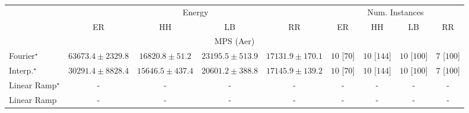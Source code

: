 \begin{tabular}{l|cccc|cccc|}
\toprule
& \multicolumn{4}{c|}{Energy} & \multicolumn{4}{c|}{Num. Instances} \\
            & ER & HH & LB & RR & ER & HH & LB & RR \\
\midrule
\multicolumn{9}{c}{\rule{0pt}{8pt}MPS (Aer)} \\
\midrule
Fourier$^\star$ & {\cellcolor[HTML]{800F7B}} \color[HTML]{F1F1F1} $63673.4\pm 2329.8$ & {\cellcolor[HTML]{EBF3F8}} \color[HTML]{000000} $16820.8\pm 51.2$ & {\cellcolor[HTML]{D2E2EE}} \color[HTML]{000000} $23195.5\pm 513.9$ & {\cellcolor[HTML]{EAF3F8}} \color[HTML]{000000} $17131.9\pm 170.1$ & {\cellcolor[HTML]{49006A}} \color[HTML]{F1F1F1} $10$ [$70$] & {\cellcolor[HTML]{49006A}} \color[HTML]{F1F1F1} $10$ [$144$] & {\cellcolor[HTML]{49006A}} \color[HTML]{F1F1F1} $10$ [$100$] & {\cellcolor[HTML]{CD238F}} \color[HTML]{F1F1F1} $7$ [$100$] \\
Interp.$^\star$ & {\cellcolor[HTML]{B2CAE1}} \color[HTML]{000000} $30291.4\pm 8828.4$ & {\cellcolor[HTML]{EFF6FA}} \color[HTML]{000000} $15646.5\pm 437.4$ & {\cellcolor[HTML]{DFEBF4}} \color[HTML]{000000} $20601.2\pm 388.8$ & {\cellcolor[HTML]{EAF3F8}} \color[HTML]{000000} $17145.9\pm 139.2$ & {\cellcolor[HTML]{49006A}} \color[HTML]{F1F1F1} $10$ [$70$] & {\cellcolor[HTML]{49006A}} \color[HTML]{F1F1F1} $10$ [$144$] & {\cellcolor[HTML]{49006A}} \color[HTML]{F1F1F1} $10$ [$100$] & {\cellcolor[HTML]{CD238F}} \color[HTML]{F1F1F1} $7$ [$100$] \\
Linear Ramp$^\star$ & {\cellcolor[HTML]{000000}} \color[HTML]{F1F1F1} {\cellcolor{white}} \color{black} - & {\cellcolor[HTML]{000000}} \color[HTML]{F1F1F1} {\cellcolor{white}} \color{black} - & {\cellcolor[HTML]{000000}} \color[HTML]{F1F1F1} {\cellcolor{white}} \color{black} - & {\cellcolor[HTML]{000000}} \color[HTML]{F1F1F1} {\cellcolor{white}} \color{black} - & {\cellcolor[HTML]{000000}} \color[HTML]{F1F1F1} {\cellcolor{white}} \color{black} - & {\cellcolor[HTML]{000000}} \color[HTML]{F1F1F1} {\cellcolor{white}} \color{black} - & {\cellcolor[HTML]{000000}} \color[HTML]{F1F1F1} {\cellcolor{white}} \color{black} - & {\cellcolor[HTML]{000000}} \color[HTML]{F1F1F1} {\cellcolor{white}} \color{black} - \\
Linear Ramp & {\cellcolor[HTML]{000000}} \color[HTML]{F1F1F1} {\cellcolor{white}} \color{black} - & {\cellcolor[HTML]{000000}} \color[HTML]{F1F1F1} {\cellcolor{white}} \color{black} - & {\cellcolor[HTML]{000000}} \color[HTML]{F1F1F1} {\cellcolor{white}} \color{black} - & {\cellcolor[HTML]{000000}} \color[HTML]{F1F1F1} {\cellcolor{white}} \color{black} - & {\cellcolor[HTML]{000000}} \color[HTML]{F1F1F1} {\cellcolor{white}} \color{black} - & {\cellcolor[HTML]{000000}} \color[HTML]{F1F1F1} {\cellcolor{white}} \color{black} - & {\cellcolor[HTML]{000000}} \color[HTML]{F1F1F1} {\cellcolor{white}} \color{black} - & {\cellcolor[HTML]{000000}} \color[HTML]{F1F1F1} {\cellcolor{white}} \color{black} - \\

\end{tabular}
